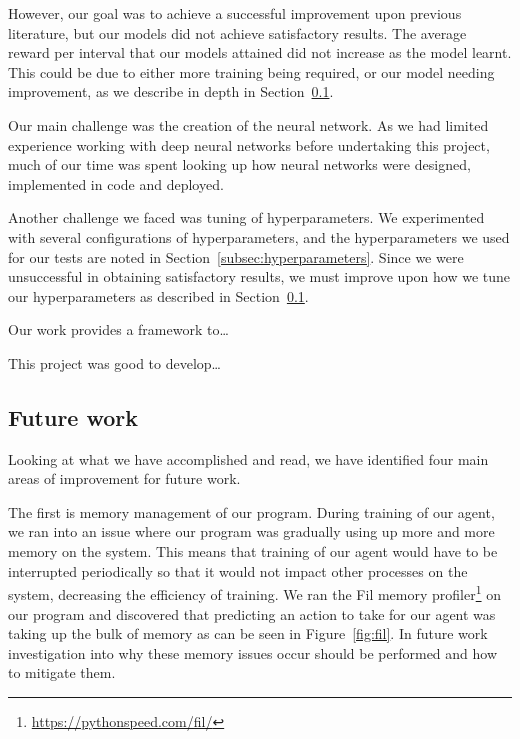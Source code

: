 \documentclass[12pt,a4paper]{article}
\begin{document}
    However, our goal was to achieve a successful improvement upon previous literature, but our models did not achieve satisfactory results.
    The average reward per interval that our models attained did not increase as the model learnt.
    This could be due to either more training being required, or our model needing improvement, as we describe in depth in Section~\ref{subsec:future-work}.


    Our main challenge was the creation of the neural network.
    As we had limited experience working with deep neural networks before undertaking this project, much of our time was spent
    looking up how neural networks were designed, implemented in code and deployed.

    Another challenge we faced was tuning of hyperparameters.
    We experimented with several configurations of hyperparameters, and the hyperparameters we used for our tests are noted in Section~\ref{subsec:hyperparameters}.
    Since we were unsuccessful in obtaining satisfactory results, we must improve upon how we tune our hyperparameters as described in Section~\ref{subsec:future-work}.



    Our work provides a framework to\ldots

    This project was good to develop\ldots



    \subsection{Future work}\label{subsec:future-work}
    Looking at what we have accomplished and read, we have identified four main areas of improvement for future work.

    The first is memory management of our program.
    During training of our agent, we ran into an issue where our program was gradually using up more and more memory on the system.
    This means that training of our agent would have to be interrupted periodically so that it would not impact other processes on the system, decreasing the efficiency of training.
    We ran the Fil memory profiler\footnote{\url{https://pythonspeed.com/fil/}} on our program and discovered that predicting an action to take for our agent was taking up the bulk of memory as can be seen in Figure~\ref{fig:fil}.
    In future work investigation into why these memory issues occur should be performed and how to mitigate them.
\end{document}
